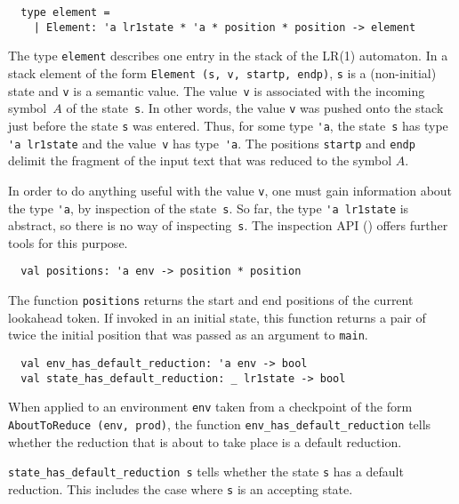 \documentclass[onecolumn,11pt,nocopyrightspace,preprint]{sigplanconf}
\begin{document}

\begin{verbatim}
  type element =
    | Element: 'a lr1state * 'a * position * position -> element
\end{verbatim}

The type \verb+element+ describes one entry in the stack of the LR(1)
automaton. In a stack element of the form \verb+Element (s, v, startp, endp)+,
\verb+s+ is a (non-initial) state and \verb+v+ is a semantic value. The
value~\verb+v+ is associated with the incoming symbol~$A$ of the
state~\verb+s+. In other words, the value \verb+v+ was pushed onto the stack
just before the state \verb+s+ was entered. Thus, for some type \verb+'a+, the
state~\verb+s+ has type \verb+'a lr1state+ and the value~\verb+v+ has
type~\verb+'a+. The positions \verb+startp+ and \verb+endp+ delimit the
fragment of the input text that was reduced to the symbol $A$.

In order to do anything useful with the value \verb+v+, one must gain
information about the type \verb+'a+, by inspection of the state~\verb+s+. So
far, the type \verb+'a lr1state+ is abstract, so there is no way of
inspecting~\verb+s+. The inspection API () offers further
tools for this purpose.


\begin{verbatim}
  val positions: 'a env -> position * position
\end{verbatim}

The function \verb+positions+ returns the start and end positions of the
current lookahead token. If invoked in an initial state, this function returns
a pair of twice the initial position that was passed as an argument
to \verb+main+.


\begin{verbatim}
  val env_has_default_reduction: 'a env -> bool
  val state_has_default_reduction: _ lr1state -> bool
\end{verbatim}

When applied to an environment \verb+env+ taken from a checkpoint of the form
\verb+AboutToReduce (env, prod)+, the function
\verb+env_has_default_reduction+ tells whether the reduction that is about to
take place is a default reduction.

\verb+state_has_default_reduction s+ tells whether the state \verb+s+ has a default
reduction. This includes the case where \verb+s+ is an accepting state.
\end{document}
